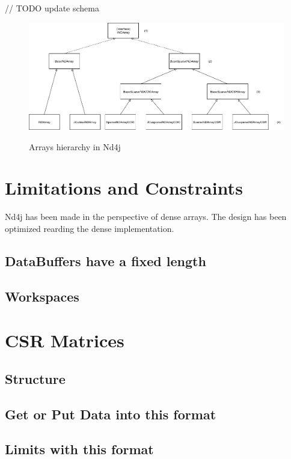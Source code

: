 // TODO update schema
 
\begin{figure}[H]
	\begin{center}
		\includegraphics[width=6.5in]{images/INDArrayHierarchy.png} 
		\label{fig:hierarchy}
		\caption{Arrays hierarchy in Nd4j}
	\end{center}
\end{figure}


\section{Limitations and Constraints}

Nd4j has been made in the perspective of dense arrays. The design has been optimized rearding the dense implementation. 

\subsection{DataBuffers have a fixed length}
\subsection{Workspaces}

\section{CSR Matrices}
\subsection{Structure}
\subsection{Get or Put Data into this format}
\subsection{Limits with this format}

